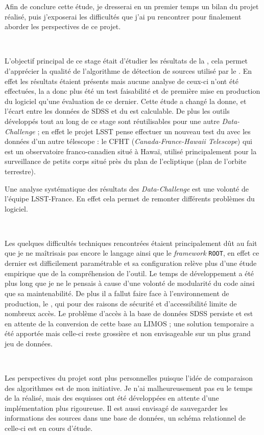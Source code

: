 
Afin de conclure cette étude, je dresserai en un premier temps un bilan du projet réalisé, puis j'exposerai les difficultés que j'ai pu rencontrer pour finalement aborder les perspectives de ce projet.

\ 

L'objectif principal de ce stage était d'étudier les résultats de la \DC{}, cela permet d'apprécier la qualité de l'algorithme de détection de sources utilisé par le \stack. En effet les résultats étaient présents mais aucune analyse de ceux-ci n'ont été effectuées, la \DC{} a donc plus été un test faisabilité et de première mise en production du logiciel \stack{} qu'une évaluation de ce dernier. Cette étude a changé la donne, et l'écart entre les données de SDSS et du \stack{} est calculable. De plus les outils développés tout au long de ce stage sont réutilisables pour une autre \emph{Data-Challenge} ; en effet le projet LSST pense effectuer un nouveau test du \stack{} avec les données d'un autre télescope : le CFHT (\emph{Canada-France-Hawaii Telescope}) qui est un observatoire franco-canadien situé à Hawaï, utilisé principalement pour la surveillance de petits corps situé près du plan de l'ecliptique (plan de l'orbite terrestre).

Une analyse systématique des résultats des \emph{Data-Challenge} est une volonté de l'équipe LSST-France. En effet cela permet de remonter différents problèmes du logiciel.

\ 

Les quelques difficultés techniques rencontrées étaient principalement dût au fait que je ne maîtrisais pas encore le langage \Python{} ainsi que le \emph{framework} \texttt{ROOT}, en effet ce dernier est difficilement paramétrable et sa configuration relève plus d'une étude empirique que de la compréhension de l'outil. Le temps de développement a été plus long que je ne le pensais à cause d'une volonté de modularité du code ainsi que sa maintenabilité. De plus il a fallut faire face à l'environnement de production, le \CC{}, qui pour des raisons de sécurité et d'accessibilité limite de nombreux accès. Le problème d'accès à la base de données SDSS persiste et est en attente de la conversion de cette base au LIMOS ; une solution temporaire a été apportée mais celle-ci reste grossière et non envisageable sur un plus grand jeu de données.

\ 

Les perspectives du projet sont plus personnelles puisque l'idée de comparaison des algorithmes est de mon initiative. Je n'ai malheureusement pas eu le temps de la réalisé, mais des esquisses ont été développées en attente d'une implémentation plus rigoureuse. Il est aussi envisagé de sauvegarder les informations des sources dans une base de données, un schéma relationnel de celle-ci est en cours d'étude.

